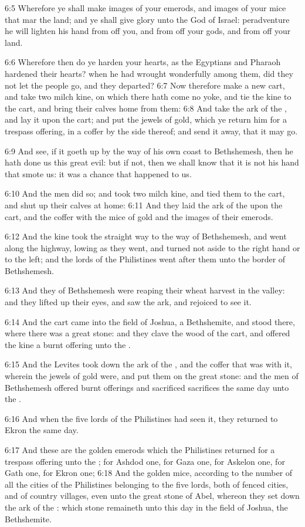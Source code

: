 6:5 Wherefore ye shall make images of your emerods, and images of your
mice that mar the land; and ye shall give glory unto the God of
Israel: peradventure he will lighten his hand from off you, and from
off your gods, and from off your land.

6:6 Wherefore then do ye harden your hearts, as the Egyptians and
Pharaoh hardened their hearts? when he had wrought wonderfully among
them, did they not let the people go, and they departed?  6:7 Now
therefore make a new cart, and take two milch kine, on which there
hath come no yoke, and tie the kine to the cart, and bring their
calves home from them: 6:8 And take the ark of the \LORD, and lay it
upon the cart; and put the jewels of gold, which ye return him for a
trespass offering, in a coffer by the side thereof; and send it away,
that it may go.

6:9 And see, if it goeth up by the way of his own coast to
Bethshemesh, then he hath done us this great evil: but if not, then we
shall know that it is not his hand that smote us: it was a chance that
happened to us.

6:10 And the men did so; and took two milch kine, and tied them to the
cart, and shut up their calves at home: 6:11 And they laid the ark of
the \LORD upon the cart, and the coffer with the mice of gold and the
images of their emerods.

6:12 And the kine took the straight way to the way of Bethshemesh, and
went along the highway, lowing as they went, and turned not aside to
the right hand or to the left; and the lords of the Philistines went
after them unto the border of Bethshemesh.

6:13 And they of Bethshemesh were reaping their wheat harvest in the
valley: and they lifted up their eyes, and saw the ark, and rejoiced
to see it.

6:14 And the cart came into the field of Joshua, a Bethshemite, and
stood there, where there was a great stone: and they clave the wood of
the cart, and offered the kine a burnt offering unto the \LORD.

6:15 And the Levites took down the ark of the \LORD, and the coffer
that was with it, wherein the jewels of gold were, and put them on the
great stone: and the men of Bethshemesh offered burnt offerings and
sacrificed sacrifices the same day unto the \LORD.

6:16 And when the five lords of the Philistines had seen it, they
returned to Ekron the same day.

6:17 And these are the golden emerods which the Philistines returned
for a trespass offering unto the \LORD; for Ashdod one, for Gaza one,
for Askelon one, for Gath one, for Ekron one; 6:18 And the golden
mice, according to the number of all the cities of the Philistines
belonging to the five lords, both of fenced cities, and of country
villages, even unto the great stone of Abel, whereon they set down the
ark of the \LORD: which stone remaineth unto this day in the field of
Joshua, the Bethshemite.

